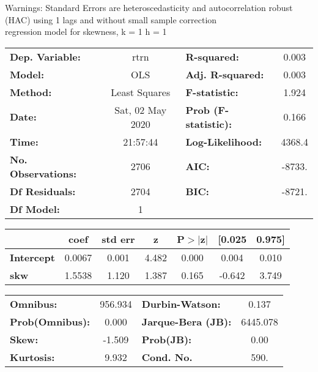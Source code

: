 Warnings: \newline
 [1] Standard Errors are heteroscedasticity and autocorrelation robust (HAC) using 1 lags and without small sample correction\\ 

regression model for skewness, k = 1 h = 1\begin{center}
\begin{tabular}{lclc}
\toprule
\textbf{Dep. Variable:}    &       rtrn       & \textbf{  R-squared:         } &     0.003   \\
\textbf{Model:}            &       OLS        & \textbf{  Adj. R-squared:    } &     0.003   \\
\textbf{Method:}           &  Least Squares   & \textbf{  F-statistic:       } &     1.924   \\
\textbf{Date:}             & Sat, 02 May 2020 & \textbf{  Prob (F-statistic):} &    0.166    \\
\textbf{Time:}             &     21:57:44     & \textbf{  Log-Likelihood:    } &    4368.4   \\
\textbf{No. Observations:} &        2706      & \textbf{  AIC:               } &    -8733.   \\
\textbf{Df Residuals:}     &        2704      & \textbf{  BIC:               } &    -8721.   \\
\textbf{Df Model:}         &           1      & \textbf{                     } &             \\
\bottomrule
\end{tabular}
\begin{tabular}{lcccccc}
                   & \textbf{coef} & \textbf{std err} & \textbf{z} & \textbf{P$> |$z$|$} & \textbf{[0.025} & \textbf{0.975]}  \\
\midrule
\textbf{Intercept} &       0.0067  &        0.001     &     4.482  &         0.000        &        0.004    &        0.010     \\
\textbf{skw}       &       1.5538  &        1.120     &     1.387  &         0.165        &       -0.642    &        3.749     \\
\bottomrule
\end{tabular}
\begin{tabular}{lclc}
\textbf{Omnibus:}       & 956.934 & \textbf{  Durbin-Watson:     } &    0.137  \\
\textbf{Prob(Omnibus):} &   0.000 & \textbf{  Jarque-Bera (JB):  } & 6445.078  \\
\textbf{Skew:}          &  -1.509 & \textbf{  Prob(JB):          } &     0.00  \\
\textbf{Kurtosis:}      &   9.932 & \textbf{  Cond. No.          } &     590.  \\
\bottomrule
\end{tabular}
\end{center}

